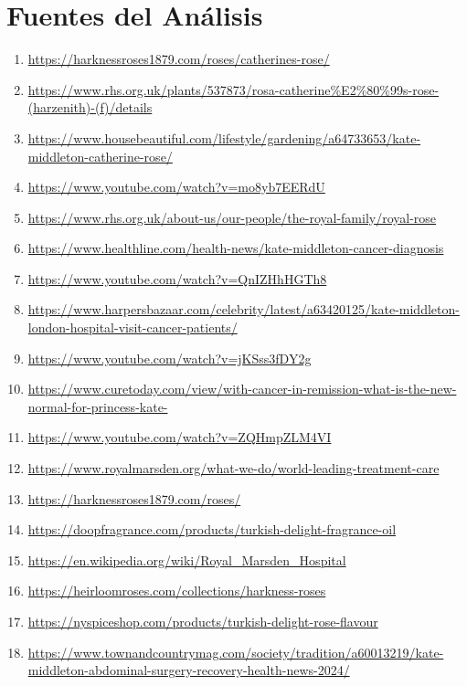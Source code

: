 \documentclass[10pt,a4paper]{article}
\begin{document}
\section*{Fuentes del Análisis}
    \begin{enumerate}[leftmargin=*]
            \item \url{ https://harknessroses1879.com/roses/catherines-rose/ }
            \item \url{ https://www.rhs.org.uk/plants/537873/rosa-catherine\%E2\%80\%99s-rose-(harzenith)-(f)/details }
            \item \url{ https://www.housebeautiful.com/lifestyle/gardening/a64733653/kate-middleton-catherine-rose/ }
            \item \url{ https://www.youtube.com/watch?v=mo8yb7EERdU }
            \item \url{ https://www.rhs.org.uk/about-us/our-people/the-royal-family/royal-rose }
            \item \url{ https://www.healthline.com/health-news/kate-middleton-cancer-diagnosis }
            \item \url{ https://www.youtube.com/watch?v=QnIZHhHGTh8 }
            \item \url{ https://www.harpersbazaar.com/celebrity/latest/a63420125/kate-middleton-london-hospital-visit-cancer-patients/ }
            \item \url{ https://www.youtube.com/watch?v=jKSss3fDY2g }
            \item \url{ https://www.curetoday.com/view/with-cancer-in-remission-what-is-the-new-normal-for-princess-kate- }
            \item \url{ https://www.youtube.com/watch?v=ZQHmpZLM4VI }
            \item \url{ https://www.royalmarsden.org/what-we-do/world-leading-treatment-care }
            \item \url{ https://harknessroses1879.com/roses/ }
            \item \url{ https://doopfragrance.com/products/turkish-delight-fragrance-oil }
            \item \url{ https://en.wikipedia.org/wiki/Royal\_Marsden\_Hospital }
            \item \url{ https://heirloomroses.com/collections/harkness-roses }
            \item \url{ https://nyspiceshop.com/products/turkish-delight-rose-flavour }
            \item \url{ https://www.townandcountrymag.com/society/tradition/a60013219/kate-middleton-abdominal-surgery-recovery-health-news-2024/ }

\end{enumerate}
\end{document}
